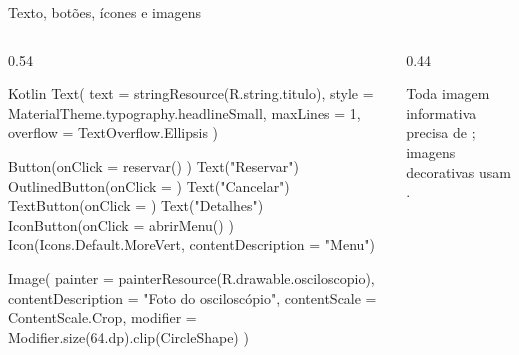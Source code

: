 \documentclass[aspectratio=169,10pt]{beamer}
\begin{document}
\begin{frame}[fragile]{Texto, botões, ícones e imagens}
  \begin{columns}[T]
    \begin{column}{0.54\textwidth}
\begin{codigo}[title=Componentes]{Kotlin}
Text(
  text = stringResource(R.string.titulo),
  style = MaterialTheme.typography.headlineSmall,
  maxLines = 1,
  overflow = TextOverflow.Ellipsis
)

Button(onClick = { reservar() }) { Text("Reservar") }
OutlinedButton(onClick = {}) { Text("Cancelar") }
TextButton(onClick = {}) { Text("Detalhes") }
IconButton(onClick = { abrirMenu() }) {
  Icon(Icons.Default.MoreVert, contentDescription = "Menu")
}

Image(
  painter = painterResource(R.drawable.osciloscopio),
  contentDescription = "Foto do osciloscópio",
  contentScale = ContentScale.Crop,
  modifier = Modifier.size(64.dp).clip(CircleShape)
)
\end{codigo}
    \end{column}
    \begin{column}{0.44\textwidth}
      \centering
      \begin{atencao}[Acessibilidade]
        Toda imagem informativa precisa de ; imagens decorativas usam .
      \end{atencao}
    \end{column}
  \end{columns}
\end{frame}
\end{document}
